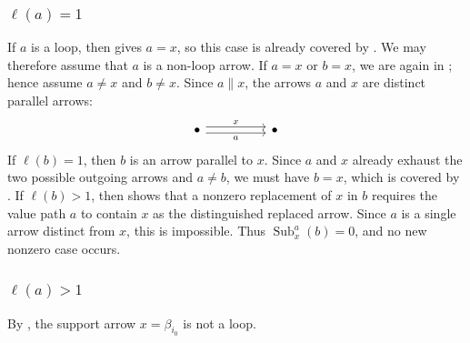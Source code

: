\documentclass[11pt,a4paper,reqno]{amsart}
\newcommand{\Sub}{\operatorname{Sub}}
\newcommand{\bi}{\beta_{i_0}}
\theoremstyle{plain}
\theoremstyle{definition}
\numberwithin{equation}{section}
\begin{document}
	\subsubsection{$\ell(a)=1$}
	If $a$ is a loop, then  gives $a=x$, so this case is already
	covered by .  We may therefore assume that $a$ is a non-loop
	arrow.  If $a=x$ or $b=x$, we are again in ; hence assume
	$a\neq x$ and $b\neq x$.  Since $a\parallel x$, the arrows $a$ and $x$ are
	distinct parallel arrows:
	\[
	\begin{tikzcd}
		\bullet && \bullet
		\arrow["a"', shift right, from=1-1, to=1-3]
		\arrow["x", shift left, from=1-1, to=1-3]
	\end{tikzcd}
	\]
	If $\ell(b)=1$, then $b$ is an arrow parallel to $x$.  Since $a$ and $x$
	already exhaust the two possible outgoing arrows and $a\neq b$, we must have
	$b=x$, which is covered by .  If $\ell(b)>1$, then
	 shows that a nonzero replacement of $x$ in
	$b$ requires the value path $a$ to contain $x$ as the distinguished replaced
	arrow.  Since $a$ is a single arrow distinct from $x$, this is impossible.
	Thus $\Sub_x^a(b)=0$, and no new nonzero case occurs.
	
	\subsubsection{$\ell(a)>1$}\label{subsec:xeqy-ella-gt-one}
	By , the support arrow $x=\bi$ is not a loop.
	
\end{document}
